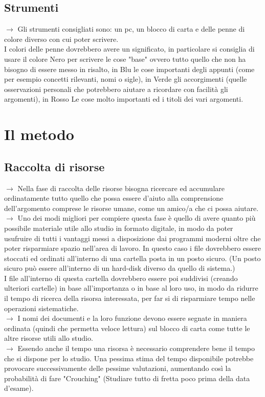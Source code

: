 \documentclass[11pt,a4paper]{article}
\begin{document}
\subsection{Strumenti}
$\rightarrow$ Gli strumenti consigliati sono: un pc, un blocco di carta e delle penne di colore diverso con cui poter scrivere.\\
 I colori delle penne dovrebbero avere un significato, in particolare si consiglia di usare il colore Nero per scrivere le cose "base" ovvero tutto quello che non ha bisogno di essere messo in risalto, in Blu le cose importanti degli appunti (come per esempio concetti rilevanti, nomi o sigle), in Verde gli accorgimenti (quelle osservazioni personali che potrebbero aiutare a ricordare con facilità gli argomenti), in Rosso Le cose molto importanti ed i titoli dei vari argomenti.\\
\newline

\section{Il metodo}
\subsection{Raccolta di risorse}
$\rightarrow$ Nella fase di raccolta delle risorse bisogna ricercare ed accumulare ordinatamente tutto quello che possa essere d'aiuto alla comprensione dell'argomento comprese le risorse umane, come un amico/a che ci possa aiutare.\\
$\rightarrow$ Uno dei modi migliori per compiere questa fase è quello di avere quanto più possibile materiale utile allo studio in formato digitale, in modo da poter usufruire di tutti i vantaggi messi a disposizione dai programmi moderni oltre che poter risparmiare spazio nell'area di lavoro. In questo caso i file dovrebbero essere stoccati ed ordinati all'interno di una cartella posta in un posto sicuro. (Un posto sicuro può essere all'interno di un hard-disk diverso da quello di sistema.)\\
I file all'interno di questa cartella dovrebbero essere poi suddivisi (creando ulteriori cartelle) in base all'importanza o in base al loro uso, in modo da ridurre il tempo di ricerca della risorsa interessata, per far si di risparmiare tempo nelle operazioni sistematiche.\\ 
$\rightarrow$ I nomi dei documenti e la loro funzione devono essere segnate in maniera ordinata (quindi che permetta veloce lettura) sul blocco di carta come tutte le altre risorse utili allo studio.\\
$\rightarrow$ Essendo anche il tempo una risorsa è necessario comprendere bene il tempo che si dispone per lo studio. Una pessima stima del tempo disponibile potrebbe provocare successivamente delle pessime valutazioni, aumentando così la probabilità di fare "Crouching" (Studiare tutto di fretta poco prima della data d'esame).\\
\end{document}
